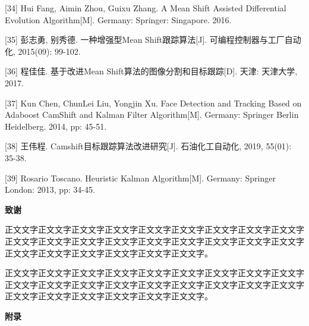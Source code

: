 \documentclass[
]{article}
\begin{document}
{[}34{]} Hui Fang, Aimin Zhou, Guixu Zhang. A Mean Shift Assisted
Differential Evolution Algorithm{[}M{]}. Germany: Springer: Singapore.
2016.

{[}35{]} 彭志勇, 别秀德. 一种增强型Mean Shift跟踪算法{[}J{]}.
可编程控制器与工厂自动化, 2015(09): 99-102.

{[}36{]} 程佳佳. 基于改进Mean Shift算法的图像分割和目标跟踪{[}D{]}.
天津: 天津大学, 2017.

{[}37{]} Kun Chen, ChunLei Liu, Yongjin Xu. Face Detection and Tracking
Based on Adaboost CamShift and Kalman Filter Algorithm{[}M{]}. Germany:
Springer Berlin Heidelberg. 2014, pp: 45-51.

{[}38{]} 王伟程. Camshift目标跟踪算法改进研究{[}J{]}. 石油化工自动化,
2019, 55(01): 35-38.

{[}39{]} Rosario Toscano. Heuristic Kalman Algorithm{[}M{]}. Germany:
Springer London: 2013, pp: 34-45.

\protect{}\label{_Toc9629}{}\textbf{致谢}

正文文字正文文字正文文字正文文字正文文字正文文字正文文字正文文字正文文字正文文字正文文字正文文字正文文字正文文字正文文字正文文字正文文字正文文字正文文字正文文字正文文字正文文字正文文字正文文字。

正文文字正文文字正文文字正文文字正文文字正文文字正文文字正文文字正文文字正文文字正文文字正文文字正文文字正文文字正文文字正文文字正文文字正文文字正文文字正文文字正文文字正文文字正文文字正文文字。

\textbf{\hfill\break
}\protect{}\label{_Toc32605}{}\textbf{附录}
\end{document}
